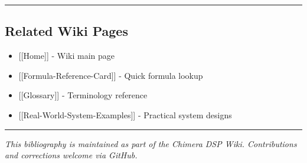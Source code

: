 \begin{center}\rule{0.5\linewidth}{0.5pt}\end{center}

\subsection{\texorpdfstring{ Related Wiki
Pages}{ Related Wiki Pages}}\label{related-wiki-pages}

\begin{itemize}
\tightlist
\item
  {[}{[}Home{]}{]} - Wiki main page
\item
  {[}{[}Formula-Reference-Card{]}{]} - Quick formula lookup
\item
  {[}{[}Glossary{]}{]} - Terminology reference
\item
  {[}{[}Real-World-System-Examples{]}{]} - Practical system designs
\end{itemize}

\begin{center}\rule{0.5\linewidth}{0.5pt}\end{center}

\emph{This bibliography is maintained as part of the Chimera DSP Wiki.
Contributions and corrections welcome via GitHub.}
